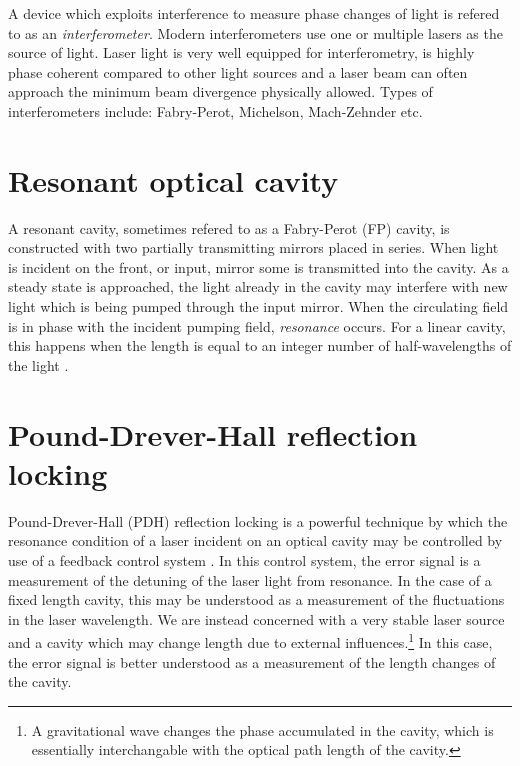 A device which exploits interference to measure phase changes of light is refered to as an \emph{interferometer}. %
Modern interferometers use one or multiple lasers as the source of light. %
Laser light is very well equipped for interferometry, is highly phase coherent compared to other light sources and a laser beam can often approach the minimum beam divergence physically allowed. %
Types of interferometers include: Fabry-Perot, Michelson, Mach-Zehnder etc.

\section{Resonant optical cavity}
A resonant cavity, sometimes refered to as a Fabry-Perot (FP) cavity, is constructed with two partially transmitting mirrors placed in series. %
When light is incident on the front, or input, mirror some is transmitted into the cavity. %
As a steady state is approached, the light already in the cavity may interfere with new light which is being pumped through the input mirror. %
When the circulating field is in phase with the incident pumping field, \emph{resonance} occurs. %
For a linear cavity, this happens when the length is equal to an integer number of half-wavelengths of the light \cite{Siegman}.



\section{Pound-Drever-Hall reflection locking}
Pound-Drever-Hall (PDH) reflection locking is a powerful technique by which the resonance condition of a laser incident on an optical cavity may be controlled by use of a feedback control system \cite{PDH}. %
In this control system, the error signal is a measurement of the detuning of the laser light from resonance. %
In the case of a fixed length cavity, this may be understood as a measurement of the fluctuations in the laser wavelength. %
We are instead concerned with a very stable laser source and a cavity which may change length due to external influences.\footnote{A gravitational wave changes the phase accumulated in the cavity, which is essentially interchangable with the optical path length of the cavity.} In this case, the error signal is better understood as a measurement of the length changes of the cavity.

